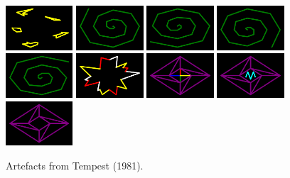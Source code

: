 \begin{figure}[H]
    \includegraphics[width=2.5cm]{preface/vector_images/vec_image_shrap.png}
    \includegraphics[width=2.5cm]{preface/vector_images/vec_image_spira1.png}
    \includegraphics[width=2.5cm]{preface/vector_images/vec_image_spira2.png}
    \includegraphics[width=2.5cm]{preface/vector_images/vec_image_spira3.png}
    \includegraphics[width=2.5cm]{preface/vector_images/vec_image_spira4.png}
    \includegraphics[width=2.5cm]{preface/vector_images/vec_image_splat.png}
    \includegraphics[width=2.5cm]{preface/vector_images/vec_image_tankf.png}
    \includegraphics[width=2.5cm]{preface/vector_images/vec_image_tankp.png}
    \includegraphics[width=2.5cm]{preface/vector_images/vec_image_tankr.png}
  \caption*{Artefacts from Tempest (1981).}
\end{figure}
\vspace*{\fill}
\thispagestyle{empty}%
\clearpage

